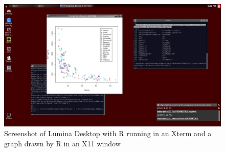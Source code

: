%

\begin{figure}[!h]
  \centering
   \includegraphics[totalheight=3in,width=1.0\textwidth]{rgraph.png}
  \caption{Screenshot of Lumina Desktop with R running in an Xterm and a graph drawn by R in an X11 window}
  \label{fig:rgraph}
\end{figure}

%

